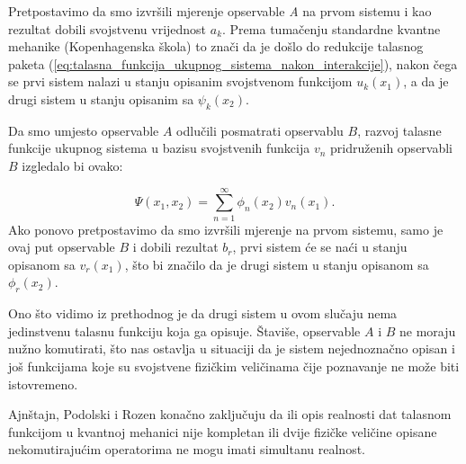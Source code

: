 Pretpostavimo da smo izvršili mjerenje opservable {\it{A}} na prvom sistemu i kao rezultat dobili svojstvenu vrijednost $a_k$.
Prema tumačenju standardne kvantne mehanike (Kopenhagenska škola) to znači da je došlo do redukcije talasnog paketa (\ref{eq:talasna_funkcija_ukupnog_sistema_nakon_interakcije}), nakon čega se prvi sistem nalazi u stanju opisanim svojstvenom funkcijom $u_k(x_1)$, a  da je drugi sistem u stanju opisanim sa $\psi_k(x_2)$.

Da smo umjesto opservable $A$ odlučili posmatrati opservablu $B$, razvoj talasne funkcije ukupnog sistema u bazisu svojstvenih funkcija $v_n$ pridruženih opservabli $B$ izgledalo bi ovako:

\begin{equation}
    \Psi(x_1, x_2) = \sum_{n=1}^{\infty} \phi_n(x_2)v_n(x_1).
\end{equation}
Ako ponovo pretpostavimo da smo izvršili mjerenje na prvom sistemu, samo je ovaj put opservable $B$ i dobili rezultat $b_r$, prvi sistem će se naći u stanju opisanom sa $v_r(x_1)$, što bi značilo da je drugi sistem u stanju opisanom sa $\phi_r(x_2)$.

Ono što vidimo iz prethodnog je da drugi sistem u ovom slučaju nema jedinstvenu talasnu funkciju koja ga opisuje.
Štaviše, opservable $A$ i $B$ ne moraju nužno komutirati, što nas ostavlja u situaciji da je sistem nejednoznačno opisan i još funkcijama koje su svojstvene fizičkim veličinama čije poznavanje ne može biti istovremeno.


Ajnštajn, Podolski i Rozen konačno zaključuju da ili opis realnosti dat talasnom funkcijom u kvantnoj mehanici nije kompletan
ili dvije fizičke veličine opisane nekomutirajućim operatorima ne mogu imati simultanu realnost.

